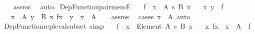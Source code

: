 \begin{isabellebody}
%
\isadelimproof
\ \ %
\endisadelimproof
%
\isatagproof
{}\isamarkupfalse%
\ assms\ \isamarkupfalse%
\ auto%
\endisatagproof
{\isafoldproof}%
%
\isadelimproof
\isanewline
%
\endisadelimproof
\isanewline
{}\isamarkupfalse%
\ Dep{\isacharunderscore}{\kern0pt}Function{\isacharunderscore}{\kern0pt}pair{\isacharunderscore}{\kern0pt}memE{\isacharprime}{\kern0pt}{\isacharcolon}{\kern0pt}\isanewline
\ \ \ {\isachardoublequoteopen}f\ {\isacharcolon}{\kern0pt}\ {\isacharparenleft}{\kern0pt}x\ {\isacharcolon}{\kern0pt}\ A{\isacharparenright}{\kern0pt}\ {\isasymrightarrow}s\ B\ x{\isachardoublequoteclose}\isanewline
\ \ \ {\isachardoublequoteopen}{\isasymlangle}x{\isacharcomma}{\kern0pt}\ y{\isasymrangle}\ {\isasymin}\ f{\isachardoublequoteclose}\isanewline
\ \ \ {\isachardoublequoteopen}x\ {\isacharcolon}{\kern0pt}\ A{\isachardoublequoteclose}\ {\isachardoublequoteopen}y\ {\isacharcolon}{\kern0pt}\ B\ x{\isachardoublequoteclose}\ {\isachardoublequoteopen}f{\isacharbackquote}{\kern0pt}x\ {\isacharequal}{\kern0pt}\ y{\isachardoublequoteclose}\ {\isacharbar}{\kern0pt}\ {\isachardoublequoteopen}{\isasymnot}{\isacharparenleft}{\kern0pt}x\ {\isacharcolon}{\kern0pt}\ A{\isacharparenright}{\kern0pt}{\isachardoublequoteclose}\isanewline
%
\isadelimproof
\ \ %
\endisadelimproof
%
\isatagproof
{}\isamarkupfalse%
\ assms\ \isamarkupfalse%
\ {\isacharparenleft}{\kern0pt}cases\ {\isachardoublequoteopen}x\ {\isacharcolon}{\kern0pt}\ A{\isachardoublequoteclose}{\isacharparenright}{\kern0pt}\ auto%
\endisatagproof
{\isafoldproof}%
%
\isadelimproof
\isanewline
%
\endisadelimproof
\isanewline
{}\isamarkupfalse%
\ Dep{\isacharunderscore}{\kern0pt}Function{\isacharunderscore}{\kern0pt}repl{\isacharunderscore}{\kern0pt}eval{\isacharunderscore}{\kern0pt}subset\ {\isacharbrackleft}{\kern0pt}simp{\isacharbrackright}{\kern0pt}{\isacharcolon}{\kern0pt}\isanewline
\ \ \ {\isachardoublequoteopen}f\ {\isacharcolon}{\kern0pt}\ {\isacharparenleft}{\kern0pt}x\ {\isacharcolon}{\kern0pt}\ Element\ A{\isacharparenright}{\kern0pt}\ {\isasymrightarrow}s\ B\ x{\isachardoublequoteclose}\isanewline
\ \ \ {\isachardoublequoteopen}{\isacharbraceleft}{\kern0pt}{\isasymlangle}x{\isacharcomma}{\kern0pt}\ f{\isacharbackquote}{\kern0pt}x{\isasymrangle}\ {\isacharbar}{\kern0pt}\ x\ {\isasymin}\ A{\isacharbraceright}{\kern0pt}\ {\isasymsubseteq}\ f{\isachardoublequoteclose}\isanewline
%
\isadelimproof
\ \ %
\endisadelimproof
%
\isatagproof

\end{isabellebody}
